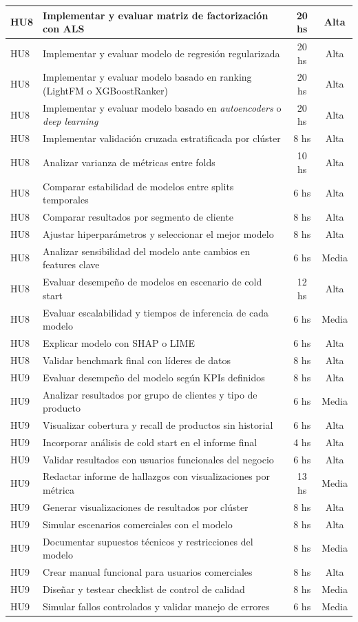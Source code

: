 \documentclass[
11pt, %
]{charter}
\begin{document}
\begin{longtable}{|p{2cm}|p{10cm}|c|c|}
HU8 & Implementar y evaluar matriz de factorización con ALS & 20 hs & Alta \\ \hline
HU8 & Implementar y evaluar modelo de regresión regularizada & 20 hs & Alta \\ \hline
HU8 & Implementar y evaluar modelo basado en ranking (LightFM o XGBoostRanker) & 20 hs & Alta \\ \hline
HU8 & Implementar y evaluar modelo basado en \textit{autoencoders} o \textit{deep learning} & 20 hs & Alta \\ \hline
HU8 & Implementar validación cruzada estratificada por clúster & 8 hs & Alta \\ \hline
HU8 & Analizar varianza de métricas entre folds & 10 hs & Alta \\ \hline
HU8 & Comparar estabilidad de modelos entre splits temporales & 6 hs & Alta \\ \hline
HU8 & Comparar resultados por segmento de cliente & 8 hs & Alta \\ \hline
HU8 & Ajustar hiperparámetros y seleccionar el mejor modelo & 8 hs & Alta \\ \hline
HU8 & Analizar sensibilidad del modelo ante cambios en features clave & 6 hs & Media \\ \hline
HU8 & Evaluar desempeño de modelos en escenario de cold start & 12 hs & Alta \\ \hline
HU8 & Evaluar escalabilidad y tiempos de inferencia de cada modelo & 6 hs & Media \\ \hline
HU8 & Explicar modelo con SHAP o LIME & 6 hs & Alta \\ \hline
HU8 & Validar benchmark final con líderes de datos & 8 hs & Alta \\ \hline

HU9 & Evaluar desempeño del modelo según KPIs definidos & 8 hs & Alta \\ \hline
HU9 & Analizar resultados por grupo de clientes y tipo de producto & 6 hs & Media \\ \hline
HU9 & Visualizar cobertura y recall de productos sin historial & 6 hs & Alta \\ \hline
HU9 & Incorporar análisis de cold start en el informe final & 4 hs & Alta \\ \hline
HU9 & Validar resultados con usuarios funcionales del negocio & 6 hs & Alta \\ \hline
HU9 & Redactar informe de hallazgos con visualizaciones por métrica & 13 hs & Media \\ \hline
HU9 & Generar visualizaciones de resultados por clúster & 8 hs & Alta \\ \hline
HU9 & Simular escenarios comerciales con el modelo & 8 hs & Alta \\ \hline
HU9 & Documentar supuestos técnicos y restricciones del modelo & 8 hs & Media \\ \hline
HU9 & Crear manual funcional para usuarios comerciales & 8 hs & Alta \\ \hline
HU9 & Diseñar y testear checklist de control de calidad & 8 hs & Media \\ \hline
HU9 & Simular fallos controlados y validar manejo de errores & 6 hs & Media \\ \hline


\end{longtable}
\end{document}

